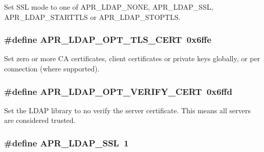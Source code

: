 Set S\-S\-L mode to one of A\-P\-R\-\_\-\-L\-D\-A\-P\-\_\-\-N\-O\-N\-E, A\-P\-R\-\_\-\-L\-D\-A\-P\-\_\-\-S\-S\-L, A\-P\-R\-\_\-\-L\-D\-A\-P\-\_\-\-S\-T\-A\-R\-T\-T\-L\-S or A\-P\-R\-\_\-\-L\-D\-A\-P\-\_\-\-S\-T\-O\-P\-T\-L\-S. \hypertarget{group___a_p_r___util___l_d_a_p_gaa36993968e0225cb175eb17039337433}{
\subsubsection[{A\-P\-R\-\_\-\-L\-D\-A\-P\-\_\-\-O\-P\-T\-\_\-\-T\-L\-S\-\_\-\-C\-E\-R\-T}]{\setlength{\rightskip}{0pt plus 5cm}\#define A\-P\-R\-\_\-\-L\-D\-A\-P\-\_\-\-O\-P\-T\-\_\-\-T\-L\-S\-\_\-\-C\-E\-R\-T~0x6ffe}}\label{group___a_p_r___util___l_d_a_p_gaa36993968e0225cb175eb17039337433}
Set zero or more C\-A certificates, client certificates or private keys globally, or per connection (where supported). \hypertarget{group___a_p_r___util___l_d_a_p_ga30949c4b417283ea02049267a5b7b1b1}{
\subsubsection[{A\-P\-R\-\_\-\-L\-D\-A\-P\-\_\-\-O\-P\-T\-\_\-\-V\-E\-R\-I\-F\-Y\-\_\-\-C\-E\-R\-T}]{\setlength{\rightskip}{0pt plus 5cm}\#define A\-P\-R\-\_\-\-L\-D\-A\-P\-\_\-\-O\-P\-T\-\_\-\-V\-E\-R\-I\-F\-Y\-\_\-\-C\-E\-R\-T~0x6ffd}}\label{group___a_p_r___util___l_d_a_p_ga30949c4b417283ea02049267a5b7b1b1}
Set the L\-D\-A\-P library to no verify the server certificate. This means all servers are considered trusted. \hypertarget{group___a_p_r___util___l_d_a_p_ga5e7057df19b0271f8776db8d9a5be863}{
\subsubsection[{A\-P\-R\-\_\-\-L\-D\-A\-P\-\_\-\-S\-S\-L}]{\setlength{\rightskip}{0pt plus 5cm}\#define A\-P\-R\-\_\-\-L\-D\-A\-P\-\_\-\-S\-S\-L~1}}\label{group___a_p_r___util___l_d_a_p_ga5e7057df19b0271f8776db8d9a5be863}
